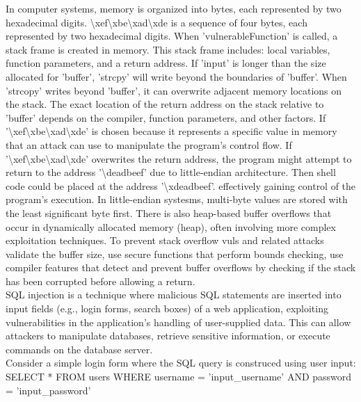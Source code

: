 \documentclass{article}
\begin{document}
	In computer systems, memory is organized into bytes, each represented by two hexadecimal digits. \textbackslash{}xef\textbackslash{}xbe\textbackslash{}xad\textbackslash{}xde is a sequence of four bytes, each represented by two hexadecimal digits. When 'vulnerableFunction' is called, a stack frame is created in memory. This stack frame includes: local variables, function parameters, and a return address. If 'input' is longer than the size allocated for 'buffer', 'strcpy' will write beyond the boundaries of 'buffer'. When 'strcopy' writes beyond 'buffer', it can overwrite adjacent memory locations on the stack. The exact location of the return address on the stack relative to 'buffer' depends on the compiler, function parameters, and other factors. If '\textbackslash{}xef\textbackslash{}xbe\textbackslash{}xad\textbackslash{}xde' is chosen because it represents a specific value in memory that an attack can use to manipulate the program's control flow. If '\textbackslash{}xef\textbackslash{}xbe\textbackslash{}xad\textbackslash{}xde' overwrites the return address, the program might attempt to return to the address '\textbackslash{}deadbeef' due to little-endian architecture. Then shell code could be placed at the address '\textbackslash{}xdeadbeef'. effectively gaining control of the program's execution. In little-endian systesms, multi-byte values are stored with the least significant byte first. There is also heap-based buffer overflows that occur in dynamically allocated memory (heap), often involving more complex exploitation techniques. To prevent stack overflow vuls and related attacks validate the buffer size, use secure functions that perform bounds checking, use compiler features that detect and prevent buffer overflows by checking if the stack has been corrupted before allowing a return.\\
	
	SQL injection is a technique where malicious SQL statements are inserted into input fields (e.g., login forms, search boxes) of a web application, exploiting vulnerabilities in the application's handling of user-supplied data. This can allow attackers to manipulate databases, retrieve sensitive information, or execute commands on the database server.\\
	
	Consider a simple login form where the SQL query is construced using user input:
	SELECT * FROM users WHERE username = 'input\_username' AND password = 'input\_password'\\
	
\end{document}
